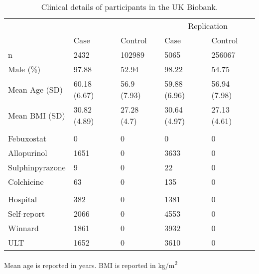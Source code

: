 \documentclass[twoside,openright]{report}
\begin{document}
\begin{table}[!h]

\caption{\label{tab:unnamed-chunk-6}\label{tab:ukbbclin} Clinical details of participants in the UK Biobank.}
\centering
\begin{threeparttable}
\begin{tabular}[t]{lllll}
\toprule
\multicolumn{1}{c}{} & \multicolumn{1}{c}{} & \multicolumn{1}{c}{} & \multicolumn{2}{c}{Replication} \\
\cmidrule(l{2pt}r{2pt}){4-5}
 & Case & Control & Case & Control\\
\midrule
n & 2432 & 102989 & 5065 & 256067\\
Male (\%) & 97.88 & 52.94 & 98.22 & 54.75\\
Mean Age (SD) & 60.18 (6.67) & 56.9 (7.93) & 59.88 (6.96) & 56.94 (7.98)\\
Mean BMI (SD) & 30.82 (4.89) & 27.28 (4.7) & 30.64 (4.97) & 27.13 (4.61)\\
\addlinespace[0.3em]
\multicolumn{5}{l}{\textbf{Gout medication}}\\
\hspace{1em}Febuxostat & 0 & 0 & 0 & 0\\
\hspace{1em}Allopurinol & 1651 & 0 & 3633 & 0\\
\hspace{1em}Sulphinpyrazone & 9 & 0 & 22 & 0\\
\hspace{1em}Colchicine & 63 & 0 & 135 & 0\\
\addlinespace[0.3em]
\multicolumn{5}{l}{\textbf{Gout classification}}\\
\hspace{1em}Hospital & 382 & 0 & 1381 & 0\\
\hspace{1em}Self-report & 2066 & 0 & 4553 & 0\\
\hspace{1em}Winnard & 1861 & 0 & 3932 & 0\\
\hspace{1em}ULT & 1652 & 0 & 3610 & 0\\
\bottomrule
\end{tabular}
\begin{tablenotes}
\item Mean age is reported in years. BMI is reported in kg/m\textsuperscript{2}
\end{tablenotes}
\end{threeparttable}
\end{table}
\end{document}
